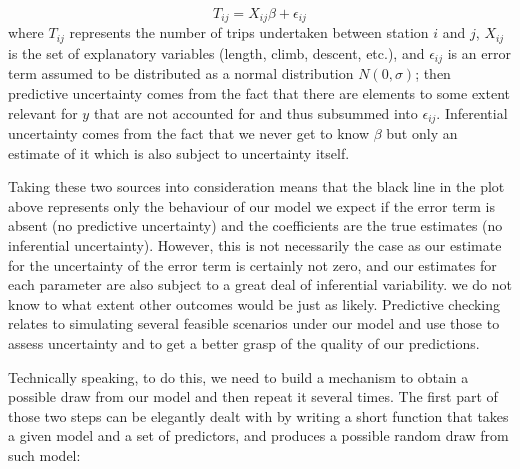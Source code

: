 \documentclass[
]{book}
\newenvironment{Shaded}{\begin{snugshade}}{\end{snugshade}}
\newcommand{\CommentTok}[1]{\textcolor[rgb]{0.56,0.35,0.01}{\textit{#1}}}
\newcommand{\ControlFlowTok}[1]{\textcolor[rgb]{0.13,0.29,0.53}{\textbf{#1}}}
\newcommand{\DecValTok}[1]{\textcolor[rgb]{0.00,0.00,0.81}{#1}}
\newcommand{\KeywordTok}[1]{\textcolor[rgb]{0.13,0.29,0.53}{\textbf{#1}}}
\newcommand{\NormalTok}[1]{#1}
\newcommand{\OperatorTok}[1]{\textcolor[rgb]{0.81,0.36,0.00}{\textbf{#1}}}
\newcommand{\StringTok}[1]{\textcolor[rgb]{0.31,0.60,0.02}{#1}}
\begin{document}
\[
T_{ij} = X_{ij}\beta + \epsilon_{ij}
\]
where \(T_{ij}\) represents the number of trips undertaken between station \(i\) and \(j\), \(X_{ij}\) is the set of explanatory variables (length, climb, descent, etc.), and \(\epsilon_{ij}\) is an error term assumed to be distributed as a normal distribution \(N(0, \sigma)\); then predictive uncertainty comes from the fact that there are elements to some extent relevant for \(y\) that are not accounted for and thus subsummed into \(\epsilon_{ij}\). Inferential uncertainty comes from the fact that we never get to know \(\beta\) but only an estimate of it which is also subject to uncertainty itself.

Taking these two sources into consideration means that the black line in the plot above represents only the behaviour of our model we expect if the error term is absent (no predictive uncertainty) and the coefficients are the true estimates (no inferential uncertainty). However, this is not necessarily the case as our estimate for the uncertainty of the error term is certainly not zero, and our estimates for each parameter are also subject to a great deal of inferential variability. we do not know to what extent other outcomes would be just as likely. Predictive checking relates to simulating several feasible scenarios under our model and use those to assess uncertainty and to get a better grasp of the quality of our predictions.

Technically speaking, to do this, we need to build a mechanism to obtain a possible draw from our model and then repeat it several times. The first part of those two steps can be elegantly dealt with by writing a short function that takes a given model and a set of predictors, and produces a possible random draw from such model:

\begin{Shaded}
\end{Shaded}
\end{document}
